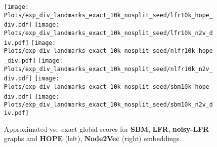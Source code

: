  \begin{figure}[ht]
     \centering
     \texttt{[image: Plots/exp\_div\_landmarks\_exact\_10k\_nosplit\_seed/lfr10k\_hope\_div.pdf]}
         \hspace{.1cm}
     \texttt{[image: Plots/exp\_div\_landmarks\_exact\_10k\_nosplit\_seed/lfr10k\_n2v\_div.pdf]}
     \vspace{.1cm}
     \texttt{[image: Plots/exp\_div\_landmarks\_exact\_10k\_nosplit\_seed/nlfr10k\_hope\_div.pdf]}
         \hspace{.1cm}
     \texttt{[image: Plots/exp\_div\_landmarks\_exact\_10k\_nosplit\_seed/nlfr10k\_n2v\_div.pdf]}
     \vspace{.1cm}
     \texttt{[image: Plots/exp\_div\_landmarks\_exact\_10k\_nosplit\_seed/sbm10k\_hope\_div.pdf]}
         \hspace{.1cm}
     \texttt{[image: Plots/exp\_div\_landmarks\_exact\_10k\_nosplit\_seed/sbm10k\_n2v\_div.pdf]}
     \caption{Approximated vs.\ exact global scores for \textbf{SBM}, \textbf{LFR}, \textbf{noisy-LFR} graphs and \textbf{HOPE} (left), \textbf{Node2Vec} (right) embeddings.}
     \label{fig:10kapprox_exact_divseed}
 \end{figure}

%
%

